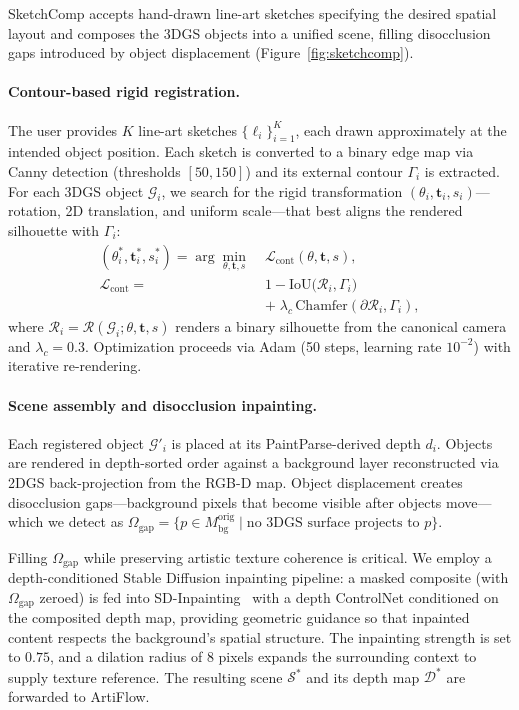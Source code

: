 SketchComp accepts hand-drawn line-art sketches specifying the desired spatial
layout and composes the 3DGS objects into a unified scene, filling disocclusion
gaps introduced by object displacement (Figure~\ref{fig:sketchcomp}).

\paragraph{Contour-based rigid registration.}
The user provides $K$ line-art sketches $\{\ell_i\}_{i=1}^{K}$, each drawn
approximately at the intended object position. Each sketch is converted to a
binary edge map via Canny detection (thresholds $[50,150]$) and its external
contour $\Gamma_i$ is extracted. For each 3DGS object $\mathcal{G}_i$, we search
for the rigid transformation $(\theta_i, \mathbf{t}_i, s_i)$---rotation, 2D
translation, and uniform scale---that best aligns the rendered silhouette with
$\Gamma_i$:
\begin{align}
    (\theta_i^*, \mathbf{t}_i^*, s_i^*) = \arg\min_{\theta,\mathbf{t},s}\;
    & \mathcal{L}_\text{cont}(\theta,\mathbf{t},s), \label{eq:contour_reg} \\
    \mathcal{L}_\text{cont} =\; & 1 - \text{IoU}\bigl(\mathcal{R}_i,
    \Gamma_i\bigr) \nonumber\\
    & +\; \lambda_c \,
    \text{Chamfer}(\partial\mathcal{R}_i, \Gamma_i), \nonumber
\end{align}
where $\mathcal{R}_i = \mathcal{R}(\mathcal{G}_i;\theta,\mathbf{t},s)$ renders a
binary silhouette from the canonical camera and $\lambda_c = 0.3$. Optimization
proceeds via Adam (50 steps, learning rate $10^{-2}$) with iterative
re-rendering.

\paragraph{Scene assembly and disocclusion inpainting.}
Each registered object $\mathcal{G}'_i$ is placed at its PaintParse-derived
depth $d_i$. Objects are rendered in depth-sorted order against a background
layer reconstructed via 2DGS back-projection from the RGB-D map. Object
displacement creates disocclusion gaps---background pixels that become visible
after objects move---which we detect as
$\Omega_\text{gap} = \{p \in M_\text{bg}^\text{orig} \mid \text{no 3DGS surface
projects to } p\}$.

Filling $\Omega_\text{gap}$ while preserving artistic texture coherence is
critical. We employ a depth-conditioned Stable Diffusion inpainting pipeline:
a masked composite (with $\Omega_\text{gap}$ zeroed) is fed into
SD-Inpainting~\cite{rombach2022ldm} with a depth ControlNet conditioned on the
composited depth map, providing geometric guidance so that inpainted content
respects the background's spatial structure. The inpainting strength is set to
$0.75$, and a dilation radius of 8 pixels expands the surrounding context to
supply texture reference. The resulting scene $\mathcal{S}^*$ and its depth map
$\mathcal{D}^*$ are forwarded to ArtiFlow.

